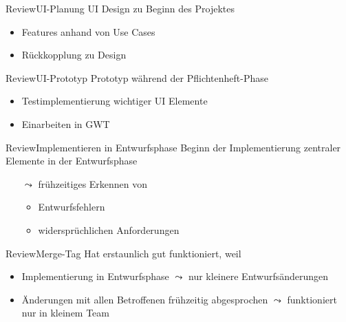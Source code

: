 \documentclass[10pt]{beamer}
\begin{document}
\begin{frame}{Review}{UI-Planung}
UI Design zu Beginn des Projektes
	\begin{itemize}
		\item Features anhand von Use Cases
		\item Rückkopplung zu Design
	\end{itemize}
\end{frame}

\begin{frame}{Review}{UI-Prototyp}
Prototyp während der Pflichtenheft-Phase
	\begin{itemize}
		\item Testimplementierung wichtiger UI Elemente
		\item Einarbeiten in GWT
	\end{itemize}
\end{frame}

\begin{frame}{Review}{Implementieren in Entwurfsphase}
Beginn der Implementierung zentraler Elemente in der Entwurfsphase 
	\begin{itemize}
		\item[$\leadsto$] frühzeitiges Erkennen von 
		\begin{itemize}
			\item Entwurfsfehlern
			\item widersprüchlichen Anforderungen
		\end{itemize}
	\end{itemize}
\end{frame}

\begin{frame}{Review}{Merge-Tag}
Hat erstaunlich gut funktioniert, weil
	\begin{itemize}
		\item Implementierung in Entwurfsphase $\leadsto$ nur kleinere Entwurfsänderungen %
		\item Änderungen mit allen Betroffenen frühzeitig abgesprochen $\leadsto$ funktioniert nur in kleinem Team
	\end{itemize}
\end{frame}
\end{document}
